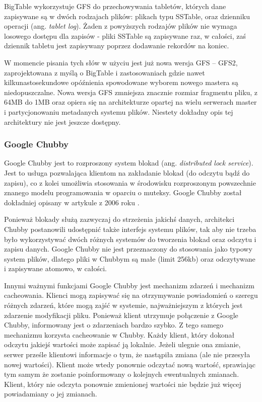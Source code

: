 BigTable wykorzystuje GFS do przechowywania tabletów, których dane zapisywane są w dwóch rodzajach plików: plikach typu SSTable, oraz dzienniku operacji (ang. \emph{tablet log}).
Żaden z powyższych rodzajów plików nie wymaga losowego dostępu dla zapisów - pliki SSTable są zapisywane raz, w całości, zaś dziennik tabletu jest zapisywany poprzez dodawanie rekordów na koniec.

W momencie pisania tych słów w użyciu jest już nowa wersja GFS -- GFS2, zaprojektowana z myślą o BigTable i zastosowaniach gdzie nawet kilkunastosekundowe opóźnienia spowodowane wyborem nowego mastera są niedopuszczalne.
Nowa wersja GFS zmniejsza znacznie rozmiar fragmentu pliku, z 64MB do 1MB oraz opiera się na architekturze opartej na wielu serwerach master i partycjonowaniu metadanych systemu plików.
Niestety dokładny opis tej architektury nie jest jeszcze dostępny.

\subsubsection*{Google Chubby}

Google Chubby jest to rozproszony system blokad (ang. \emph{distributed lock service}).
Jest to usługa pozwalająca klientom na zakładanie blokad (do odczytu bądź do zapisu), co z kolei umożliwia stosowania w środowisku rozproszonym powszechnie znanego modelu programowania w oparciu o muteksy.
Google Chubby został dokładniej opisany w artykule z 2006 roku \cite{google-chubby}.

Ponieważ blokady służą zazwyczaj do strzeżenia jakichś danych, architekci Chubby postanowili udostępnić także interfejs systemu plików, tak aby nie trzeba było wykorzystywać dwóch różnych systemów do tworzenia blokad oraz odczytu i zapisu danych.
Google Chubby nie jest przeznaczony do stosowania jako typowy system plików, dlatego pliki w Chubbym są małe (limit 256kb) oraz odczytywane i zapisywane atomowo, w całości.

Innymi ważnymi funkcjami Google Chubby jest mechanizm zdarzeń i mechanizm cacheowania.
Klienci mogą zapisywać się na otrzymywanie powiadomień o szeregu różnych zdarzeń, które mogą zajść w systemie, najważniejszym z których jest zdarzenie modyfikacji pliku.
Ponieważ klient utrzymuje połączenie z Google Chubby, informowany jest o zdarzeniach bardzo szybko.
Z tego samego mechanizmu korzysta cacheowanie w Chubby.
Każdy klient, który dokonał odczytu jakiejś wartości może zapisać ją lokalnie.
Jeżeli ulegnie ona zmianie, serwer prześle klientowi informacje o tym, że nastąpiła zmiana (ale nie przesyła nowej wartości).
Klient może wtedy ponownie odczytać nową wartość, sprawiając tym samym że zostanie poinformowany o kolejnych ewentualnych zmianach.
Klient, który nie odczyta ponownie zmienionej wartości nie będzie już więcej powiadamiany o jej zmianach.

